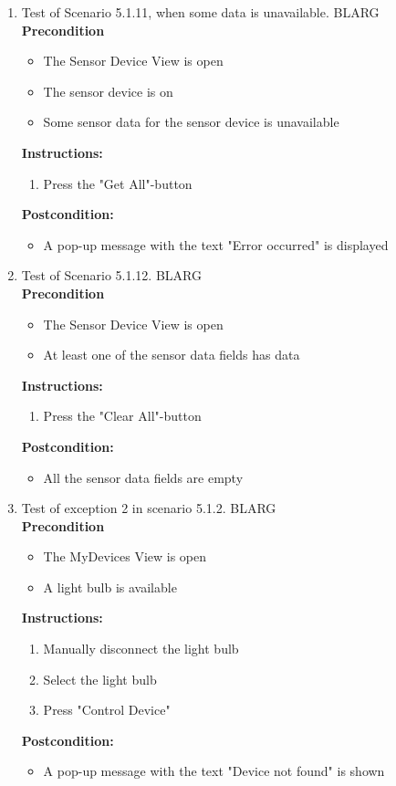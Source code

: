\documentclass[a4paper]{article}
\newlength{\testlabellength}
\newenvironment{testlist}{\begin{enumerate}[label=\bfseries Instruction \thesubsection.\arabic* , labelindent=0pt, labelwidth=\testlabellength , leftmargin=2cm]}{\end{enumerate}}
\newenvironment{precondition}{
{\color{white}BLARG}\\ 
\textbf{Precondition}
\begin{itemize}[labelindent=0cm, labelwidth=2cm , leftmargin=1cm]
}
{\end{itemize}}
\newenvironment{instruction}{
\textbf{Instructions:}
\begin{enumerate}[label=\bfseries  \arabic*., labelindent=0cm, labelwidth=2cm , leftmargin=1cm]
}
{\end{enumerate}}
\newenvironment{postcondition}{
\textbf{Postcondition:}
\begin{itemize}[labelindent=0cm, labelwidth=2cm , leftmargin=1cm]
}
{\end{itemize}}
\begin{document}
\begin{appendices}
\begin{testlist}
	\item  Test of Scenario 5.1.11, when some data is unavailable.
		\begin{precondition}
			\item The Sensor Device View is open
			\item The sensor device is on
    	    \item Some sensor data for the sensor device is unavailable
		\end{precondition}
		\begin{instruction}
			\item Press the "Get All"-button
		\end{instruction}
		\begin{postcondition} 
			\item A pop-up message with the text "Error occurred" is displayed
		\end{postcondition}

	\item Test of Scenario 5.1.12.
		\begin{precondition} 
			\item The Sensor Device View is open
			\item At least one of the sensor data fields has data
		\end{precondition}
		\begin{instruction} 
			\item Press the "Clear All"-button
		\end{instruction}
	  	\begin{postcondition}
			\item All the sensor data fields are empty
		\end{postcondition}

	\item Test of exception 2 in scenario 5.1.2. 
		\begin{precondition}
			\item The MyDevices View is open
			\item A light bulb is available
		\end{precondition}
		\begin{instruction}
			\item Manually disconnect the light bulb
			\item Select the light bulb
			\item Press "Control Device"
		\end{instruction}
		\begin{postcondition}
			\item A pop-up message with the text "Device not found" is shown
		\end{postcondition}


\end{testlist}
\end{appendices}
\end{document}
